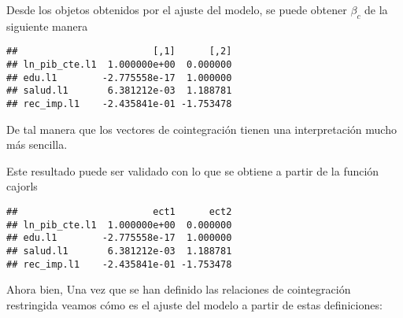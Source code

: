\documentclass[]{book}
\newenvironment{Shaded}{\begin{snugshade}}{\end{snugshade}}
\newcommand{\KeywordTok}[1]{\textcolor[rgb]{0.13,0.29,0.53}{\textbf{#1}}}
\newcommand{\DataTypeTok}[1]{\textcolor[rgb]{0.13,0.29,0.53}{#1}}
\newcommand{\DecValTok}[1]{\textcolor[rgb]{0.00,0.00,0.81}{#1}}
\newcommand{\StringTok}[1]{\textcolor[rgb]{0.31,0.60,0.02}{#1}}
\newcommand{\OperatorTok}[1]{\textcolor[rgb]{0.81,0.36,0.00}{\textbf{#1}}}
\newcommand{\NormalTok}[1]{#1}
\theoremstyle{definition}
\theoremstyle{definition}
\theoremstyle{definition}
\theoremstyle{remark}
\begin{document}
Desde los objetos obtenidos por el ajuste del modelo, se puede obtener
\(\beta_c\) de la siguiente manera

\begin{Shaded}
\end{Shaded}

\begin{verbatim}
##                        [,1]      [,2]
## ln_pib_cte.l1  1.000000e+00  0.000000
## edu.l1        -2.775558e-17  1.000000
## salud.l1       6.381212e-03  1.188781
## rec_imp.l1    -2.435841e-01 -1.753478
\end{verbatim}

De tal manera que los vectores de cointegración tienen una
interpretación mucho más sencilla.

Este resultado puede ser validado con lo que se obtiene a partir de la
función cajorls

\begin{Shaded}
\end{Shaded}

\begin{verbatim}
##                        ect1      ect2
## ln_pib_cte.l1  1.000000e+00  0.000000
## edu.l1        -2.775558e-17  1.000000
## salud.l1       6.381212e-03  1.188781
## rec_imp.l1    -2.435841e-01 -1.753478
\end{verbatim}

Ahora bien, Una vez que se han definido las relaciones de cointegración
restringida veamos cómo es el ajuste del modelo a partir de estas
definiciones:
\end{document}
